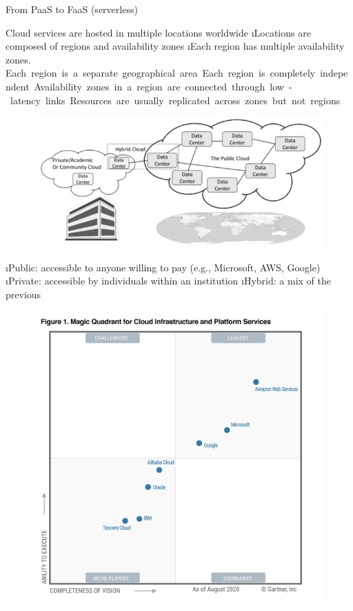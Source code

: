 \begin{frame}[allowframebreaks]{From PaaS to FaaS (serverless)}

Cloud services are hosted in multiple locations worldwide
\i Locations are composed of regions and availability zones
\i Each region has multiple availability zones. 
\si Each region is a separate geographical area
\si Each region is completely independent
\si Availability zones in a region are connected through low-latency links
\si Resources are usually replicated across zones but not regions

\framebreak

\begin{figure}
    \centering
    \includegraphics[height=.5\textheight]{imgs/cloud_types.png}
\end{figure}
\i Public: accessible to anyone willing to pay (e.g., Microsoft, AWS, Google)
\i Private: accessible by individuals within an institution
\i Hybrid: a mix of the previous

\framebreak

\begin{figure}
    \centering
    \includegraphics[height=.8\textheight]{imgs/cloud_providers.png}
\end{figure}


\end{frame}

